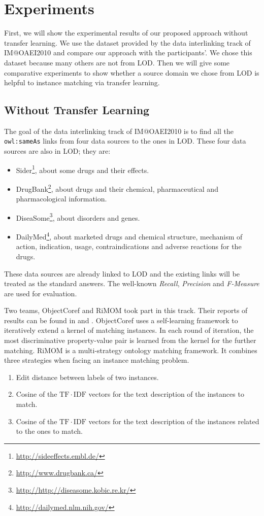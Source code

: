 \section{Experiments}
\label{sec:experiments}

First, we will show the experimental results of our proposed approach without transfer learning. We use the dataset provided by the data interlinking track of IM@OAEI2010 and compare our approach with the participants'. We chose this dataset because many others are not from LOD. Then we will give some comparative experiments to show whether a source domain we chose from LOD is helpful to instance matching via transfer learning.

\subsection{Without Transfer Learning}

The goal of the data interlinking track of IM@OAEI2010 is to find all the \texttt{owl:sameAs} links from four data sources to the ones in LOD. These four data sources are also in LOD; they are:
\begin{itemize}
\item Sider\footnote{\url{http://sideeffects.embl.de/}}, about some drugs and their effects.
\item DrugBank\footnote{\url{http://www.drugbank.ca/}}, about drugs and their chemical, pharmaceutical and pharmacological information.
\item DiseaSome\footnote{\url{http://http://diseasome.kobic.re.kr/}}, about disorders and genes.
\item DailyMed\footnote{\url{http://dailymed.nlm.nih.gov/}}, about marketed drugs and chemical structure, mechanism of action, indication, usage, contraindications and adverse reactions for the drugs.
\end{itemize}
These data sources are already linked to LOD and the existing links will be treated as the standard answers. The well-known \textit{Recall}, \textit{Precision} and \textit{F-Measure} are used for evaluation.

Two teams, ObjectCoref and RiMOM took part in this track. Their reports of results can be found in \cite{wang2010rimom} and \cite{hu2010objectcoref}. ObjectCoref\cite{hu2011self} uses a self-learning framework to iteratively extend a kernel of matching instances. In each round of iteration, the most discriminative property-value pair is learned from the kernel for the further matching. RiMOM\cite{li2009rimom} is a multi-strategy ontology matching framework. It combines three strategies when facing an instance matching problem.
\begin{enumerate}
\item Edit distance between labels of two instances.
\item Cosine of the $\mathrm{TF}\cdot\mathrm{IDF}$ vectors for the text description of the instances to match.
\item Cosine of the $\mathrm{TF}\cdot\mathrm{IDF}$ vectors for the text description of the instances related to the ones to match.
\end{enumerate}

